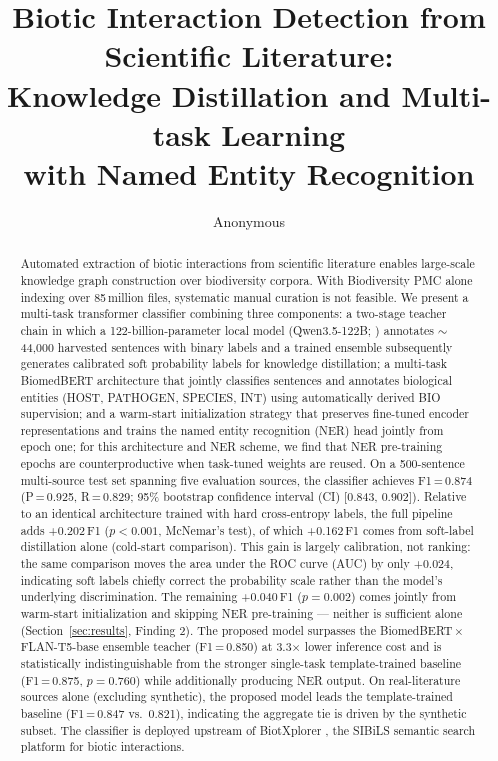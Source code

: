 \documentclass[11pt]{article}
\title{Biotic Interaction Detection from Scientific Literature:\\
Knowledge Distillation and Multi-task Learning\\
with Named Entity Recognition}
\author{Anonymous}
\begin{document}
\maketitle
\nolinenumbers  %

\begin{abstract}
Automated extraction of biotic interactions from scientific literature
enables large-scale knowledge graph construction over biodiversity corpora.
With Biodiversity PMC \citep{biodiversitypmc2024} alone indexing over
85\,million files, systematic manual curation is not feasible.
We present a multi-task transformer classifier combining three components:
a two-stage teacher chain in which a 122-billion-parameter local model
(Qwen3.5-122B; \citealt{qwen2025technical}) annotates $\sim$44,000 harvested sentences with binary labels and
a trained ensemble subsequently generates calibrated soft probability labels
for knowledge distillation; a multi-task BiomedBERT architecture that jointly
classifies sentences and annotates biological entities (HOST, PATHOGEN,
SPECIES, INT) using automatically derived BIO supervision; and a warm-start
initialization strategy that preserves fine-tuned encoder representations
and trains the named entity recognition (NER) head jointly from epoch one;
for this architecture and NER scheme, we find that NER pre-training epochs
are counterproductive
when task-tuned weights are reused.
On a 500-sentence multi-source test set spanning five evaluation sources,
the classifier achieves F1\,=\,0.874 (P\,=\,0.925, R\,=\,0.829; 95\% bootstrap
confidence interval (CI) [0.843, 0.902]). Relative to an identical
architecture trained with hard cross-entropy labels, the full pipeline
adds +0.202\,F1 ($p{<}0.001$, McNemar's test), of which +0.162\,F1 comes
from soft-label distillation alone (cold-start comparison). This gain is
largely calibration, not ranking: the same comparison moves the area
under the ROC curve (AUC) by only +0.024, indicating soft labels chiefly
correct the probability scale rather than the model's underlying
discrimination. The remaining +0.040\,F1 ($p{=}0.002$) comes jointly
from warm-start initialization and skipping NER pre-training --- neither
is sufficient alone (Section~\ref{sec:results}, Finding 2). The proposed
model surpasses the
BiomedBERT\,$\times$\,FLAN-T5-base ensemble teacher (F1\,=\,0.850) at
3.3$\times$ lower inference cost and is statistically indistinguishable
from the stronger single-task template-trained baseline (F1\,=\,0.875,
$p{=}0.760$) while additionally producing NER output.
On real-literature sources alone (excluding synthetic), the proposed
model leads the template-trained baseline (F1\,=\,0.847 vs.\ 0.821),
indicating the aggregate tie is driven by the synthetic subset.
The classifier is deployed upstream of
BiotXplorer \citep{sibils2023biotxplorer}, the SIBiLS \citep{mottin2021sibils}
semantic search platform for biotic interactions.
\end{abstract}
\end{document}
